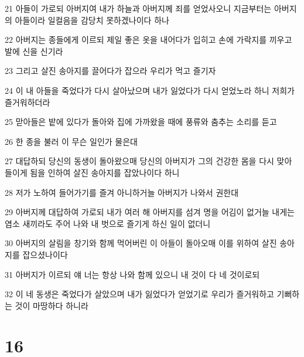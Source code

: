 \par 21 아들이 가로되 아버지여 내가 하늘과 아버지께 죄를 얻었사오니 지금부터는 아버지의 아들이라 일컬음을 감당치 못하겠나이다 하나
\par 22 아버지는 종들에게 이르되 제일 좋은 옷을 내어다가 입히고 손에 가락지를 끼우고 발에 신을 신기라
\par 23 그리고 살진 송아지를 끌어다가 잡으라 우리가 먹고 즐기자
\par 24 이 내 아들을 죽었다가 다시 살아났으며 내가 잃었다가 다시 얻었노라 하니 저희가 즐거워하더라
\par 25 맏아들은 밭에 있다가 돌아와 집에 가까왔을 때에 풍류와 춤추는 소리를 듣고
\par 26 한 종을 불러 이 무슨 일인가 물은대
\par 27 대답하되 당신의 동생이 돌아왔으매 당신의 아버지가 그의 건강한 몸을 다시 맞아 들이게 됨을 인하여 살진 송아지를 잡았나이다 하니
\par 28 저가 노하여 들어가기를 즐겨 아니하거늘 아버지가 나와서 권한대
\par 29 아버지께 대답하여 가로되 내가 여러 해 아버지를 섬겨 명을 어김이 없거늘 내게는 염소 새끼라도 주어 나와 내 벗으로 즐기게 하신 일이 없더니
\par 30 아버지의 살림을 창기와 함께 먹어버린 이 아들이 돌아오매 이를 위하여 살진 송아지를 잡으셨나이다
\par 31 아버지가 이르되 얘 너는 항상 나와 함께 있으니 내 것이 다 네 것이로되
\par 32 이 네 동생은 죽었다가 살았으며 내가 잃었다가 얻었기로 우리가 즐거워하고 기뻐하는 것이 마땅하다 하니라

\chapter{16}

